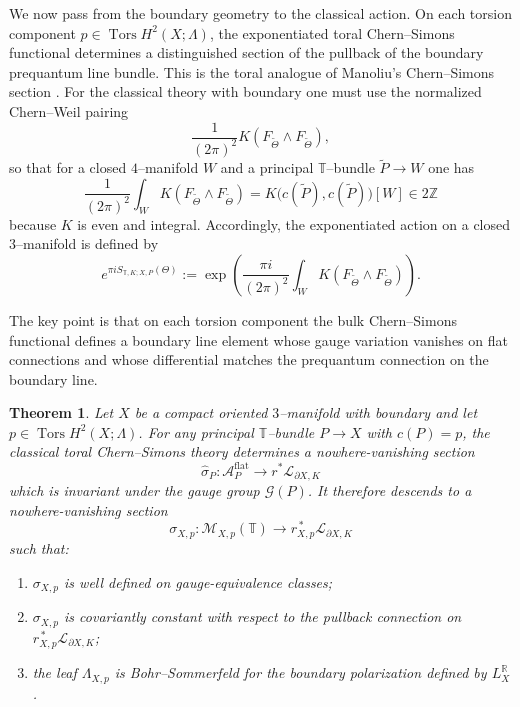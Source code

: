 \documentclass[12pt]{amsart}
\numberwithin{equation}{section}
\newtheorem{theorem}{Theorem}[section]
\DeclareMathOperator{\Tors}{Tors}
\begin{document}
We now pass from the boundary geometry to the classical action. On each torsion component \(p\in\Tors H^2(X;\Lambda)\), the exponentiated toral Chern--Simons
functional determines a distinguished section of the pullback of the boundary prequantum line bundle. This is the toral analogue of Manoliu's Chern--Simons section \cite{Manoliu2}. For the classical theory with boundary one must use the normalized
Chern--Weil pairing
\[
\frac{1}{(2\pi)^2}K(F_{\widetilde\Theta}\wedge F_{\widetilde\Theta}),
\]
so that for a closed $4$--manifold $W$ and a principal $\mathbb T$--bundle
$\widetilde P\to W$ one has
\[
\frac{1}{(2\pi)^2}
\int_W K(F_{\widetilde\Theta}\wedge F_{\widetilde\Theta})
=
K\bigl(c(\widetilde P),c(\widetilde P)\bigr)[W]\in 2\mathbb Z
\]
because $K$ is even and integral.
Accordingly, the exponentiated action on a closed $3$--manifold is defined by
\[
e^{\pi i S_{\mathbb T,K;X,P}(\Theta)}
:=
\exp\!\left(
\frac{\pi i}{(2\pi)^2}
\int_W K(F_{\widetilde\Theta}\wedge F_{\widetilde\Theta})
\right).
\]

The key point is that on each torsion component the bulk Chern--Simons functional defines a boundary
line element whose gauge variation vanishes on flat connections and whose differential matches the
prequantum connection on the boundary line.

\begin{theorem}
\label{thm:Componentwise-toral-CS-section}
Let $X$ be a compact oriented $3$--manifold with boundary and let
$p\in\Tors H^2(X;\Lambda)$.
For any principal $\mathbb T$--bundle $P\to X$ with $c(P)=p$, the classical toral
Chern--Simons theory determines a nowhere-vanishing section
\[
\widehat\sigma_P:\mathcal A_P^{\mathrm{flat}}
\longrightarrow
r^*\mathcal L_{\partial X,K}
\]
which is invariant under the gauge group $\mathcal G(P)$.
It therefore descends to a nowhere-vanishing section
\[
\sigma_{X,p}:\mathcal M_{X,p}(\mathbb T)\longrightarrow
r_{X,p}^{\,*}\mathcal L_{\partial X,K}
\]
such that:

\begin{enumerate}
\item[\textup{(i)}]
$\sigma_{X,p}$ is well defined on gauge-equivalence classes;

\item[\textup{(ii)}]
$\sigma_{X,p}$ is covariantly constant with respect to the pullback
connection on $r_{X,p}^{\,*}\mathcal L_{\partial X,K}$;

\item[\textup{(iii)}]
the leaf $\Lambda_{X,p}$ is Bohr--Sommerfeld for the boundary polarization defined by $L_X^{\mathbb R}$.
\end{enumerate}
\end{theorem}
\end{document}
